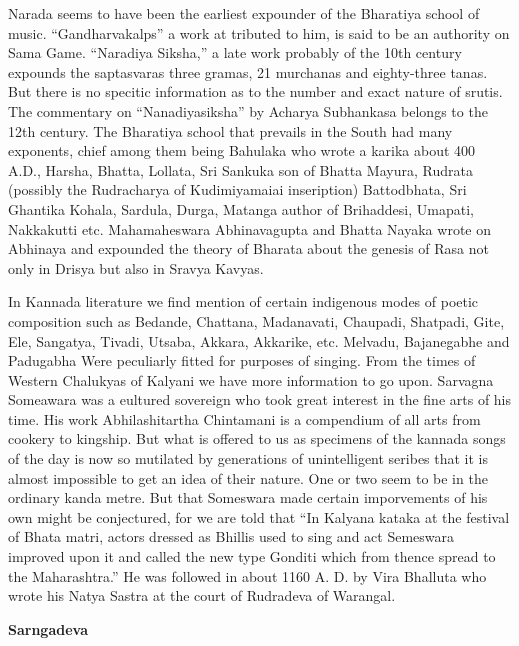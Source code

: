 \documentclass{book}
\begin{document}
Narada seems to have been the earliest expounder of the Bharatiya
school of music. ``Gandharvakalps'' a work at tributed to him, is said
to be an authority on Sama Game. ``Naradiya Siksha,'' a late work
probably of the 10th century expounds the saptasvaras three gramas, 21
murchanas and  eighty-three tanas. But there is no specitic
information as to the number and exact nature of srutis. The
commentary on ``Nanadiyasiksha'' by Acharya Subhankasa belongs to the
12th century. The Bharatiya school that prevails in the South had many
exponents, chief among them being Bahulaka who wrote a karika about
400 A.D., Harsha, Bhatta, Lollata, Sri Sankuka son of Bhatta Mayura,
Rudrata (possibly the Rudracharya of Kudimiyamaiai inseription)
Battodbhata, Sri Ghantika Kohala, Sardula, Durga, Matanga author of
Brihaddesi, Umapati, Nakkakutti etc. Mahamaheswara Abhinavagupta and
Bhatta Nayaka wrote on Abhinaya and expounded the theory of Bharata
about the genesis of Rasa not only in Drisya but also in Sravya
Kavyas.

In Kannada literature we find mention of certain indigenous modes of
poetic composition such as Bedande, Chattana, Madanavati, Chaupadi,
Shatpadi, Gite, Ele, Sangatya, Tivadi, Utsaba, Akkara, Akkarike,
etc. Melvadu, Bajanegabhe and Padugabha Were peculiarly fitted for
purposes of singing. From the times of Western Chalukyas of Kalyani we
have more information to go upon. Sarvagna Someawara was a eultured
sovereign who took great interest in the fine arts of his time. His
work Abhilashitartha Chintamani is a  compendium of all arts from
cookery to kingship. But what is offered to us as specimens of the
kannada songs of the day is now so mutilated by generations of
unintelligent seribes that it is almost impossible to get an idea of
their nature. One or two seem to be in the ordinary kanda metre. But
that Someswara made certain imporvements of his own might be
conjectured, for we are told that ``In Kalyana kataka at the festival
of Bhata matri, actors dressed as Bhillis used to sing and act
Semeswara improved upon it and called the new type Gonditi which from
thence spread to the Maharashtra.'' He was followed in about 1160
A. D. by Vira Bhalluta who wrote his Natya Sastra at the court of
Rudradeva of Warangal.

\begin{center}
\textbf{Sarngadeva}
\end{center}
\end{document}
